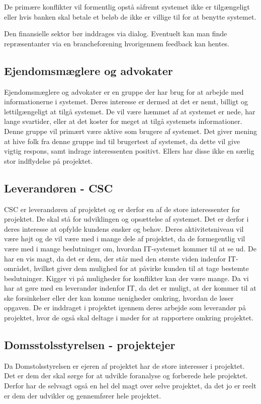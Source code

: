 \documentclass[10pt,a4paper,danish]{article}
\begin{document}
De primære konflikter vil formentlig opstå såfremt systemet ikke er
tilgængeligt eller hvis banken skal betale et beløb de ikke er villige til for at benytte systemet.

Den finansielle sektor bør inddrages via dialog. Eventuelt kan man finde
repræsentanter via en brancheforening hvorigennem feedback kan hentes.

\subsection{Ejendomsmæglere og advokater}

Ejendomsmæglere og advokater er en gruppe der har brug for at arbejde med
informationerne i systemet.
Deres interesse er dermed at det er nemt, billigt og lettilgængeligt at tilgå
systemet. De vil være hæmmet af at systemet er nede, har lange svartider, eller
at det koster for meget at tilgå systemets informationer.
Denne gruppe vil primært være aktive som brugere af systemet.
Det giver mening at hive folk fra denne gruppe ind til brugertest af systemet,
da dette vil give vigtig respons, samt indrage interessenten positivt.
Ellers har disse ikke en særlig stor indflydelse på projektet.

\subsection{Leverandøren - CSC}
CSC er leverandøren af projektet og er derfor en af de store interessenter for projektet. De skal stå for udviklingen og opsættelse af systemet. Det er derfor i deres interesse at opfylde kundens ønsker og behov. Deres aktivitetsniveau vil være højt og de vil være med i mange dele af projektet, da de formegentlig vil være med i mange beslutninger om, hvordan IT-systemet kommer til at se ud.
De har en vis magt, da det er dem, der står med den største viden indenfor IT-området, hvilket giver dem mulighed for at påvirke kunden til at tage bestemte beslutninger.
Kigger vi på muligheder for konflikter kan der være mange. Da vi har at gøre med en leverandør indenfor IT, da det er muligt, at der kommer til at ske forsinkelser eller der kan komme uenigheder omkring, hvordan de løser opgaven.
De er inddraget i projektet igennem deres arbejde som leverandør på projektet, hvor de også skal deltage i møder for at rapportere omkring projektet. 

\subsection{Domsstolsstyrelsen - projektejer}
Da Domstolsstyrelsen er ejeren af projektet har de store interesser i projektet. Det er dem der skal sørge for at udvikle foranalyse og forberede hele projektet. Derfor har de selvsagt også en hel del magt over selve projektet, da det jo er reelt er dem der udvikler og gennemfører hele projektet.
\end{document}
